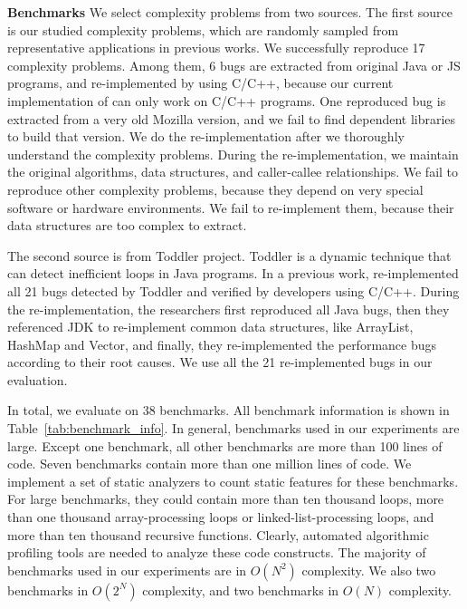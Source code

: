 %

\textbf{Benchmarks}
We select complexity problems from two sources. 
The first source is our studied complexity problems, 
which are randomly sampled from representative applications in previous works\cite{PerfBug,SongOOPSLA2014}.
We successfully reproduce 17 complexity problems. 
Among them, 6 bugs are extracted from original Java or JS programs, 
and re-implemented by using C/C++, 
because our current implementation of \Tool can only work on C/C++ programs.
One reproduced bug is extracted from a very old Mozilla version, 
and we fail to find dependent libraries to build that version. 
We do the re-implementation after we thoroughly understand the complexity problems.
During the re-implementation, we maintain the original algorithms, 
data structures, and caller-callee relationships. 
We fail to reproduce other complexity problems, 
because they depend on very special software or hardware environments.
We fail to re-implement them, 
because their data structures are too complex to extract.

The second source is from Toddler project\cite{Alabama}. 
Toddler is a dynamic technique that can detect inefficient loops in Java programs.
In a previous work, \cite{ldoctor} re-implemented all 
21 bugs detected by Toddler and verified by developers using C/C++.
During the re-implementation, the researchers first reproduced all Java bugs, 
then they referenced JDK to re-implement 
common data structures, like ArrayList, HashMap and Vector, 
and finally, they re-implemented the performance bugs according to their root causes. 
We use all the 21 re-implemented bugs in our evaluation.  

In total, we evaluate \Tool on 38 benchmarks. 
All benchmark information is shown in Table~\ref{tab:benchmark_info}.
In general, benchmarks used in our experiments are large. 
Except one benchmark, all other benchmarks are more than 100 lines of code. 
Seven benchmarks contain more than one million lines of code. 
We implement a set of static analyzers to count static features for these benchmarks. 
For large benchmarks, 
they could contain more than ten thousand loops, more than one 
thousand array-processing loops or linked-list-processing loops, 
and more than ten thousand recursive functions. 
Clearly, automated algorithmic profiling tools are needed to analyze these code constructs. 
The majority of benchmarks used in our experiments are in $O(N^2)$ complexity. 
We also two benchmarks in $O(2^N)$ complexity, 
and two benchmarks in $O(N)$ complexity. 

